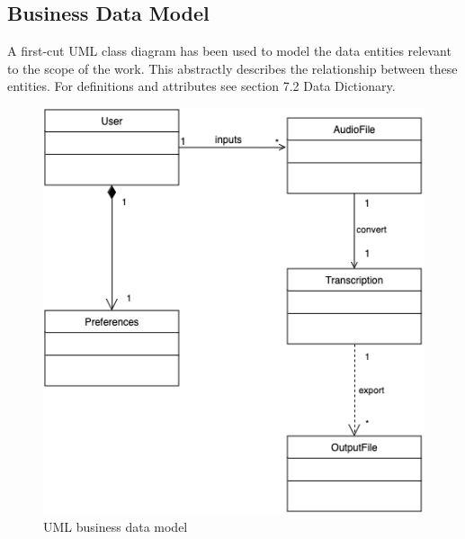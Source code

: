 \documentclass[12pt]{article}
\begin{document}
\subsection{Business Data Model}
A first-cut UML class diagram has been used to model the data entities relevant to the scope of the work. This
abstractly describes the relationship between these entities. For definitions and attributes see section 7.2 Data Dictionary. \\
\begin{figure}[H]
  \includegraphics[width=\textwidth]{SRS-data-model.png}
  \caption{UML business data model}
\end{figure}
\end{document}
